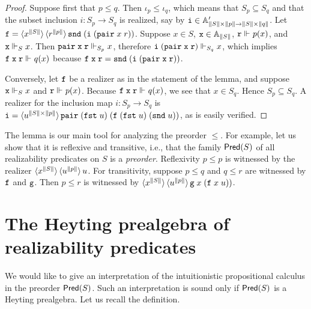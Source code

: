 \begin{proof}
  Suppose first that $p \leq q$. Then $\iota_p \leq \iota_q$, which
  means that $S_p \subseteq S_q$ and that the subset inclusion $i :
  S_p \to S_q$ is realized, say by $\R{i} \in \subAtyp{\T{S} \times \T{p}
    \to \T{S} \times \T{q}}$. Let $\R{f} = \tpcalam{x}{\T{S}}
    \tpcalam{r}{\T{p}}{\combSnd\;(\R{i}\;(\combPair\;x\;r))}$. Suppose $x
  \in S$, $\R{x} \in \Atyp{\T{S}}$, $\R{r} \rz p(x)$, and $\R{x} \rz[S]
  x$. Then $\combPair\;\R{x}\;\R{r} \rz[S_p] x$, therefore
  $\R{i}\;(\combPair\;\R{x}\;\R{r}) \rz[S_q] x$, which implies
  $\R{f}\;\R{x}\;\R{r} \rz q(x)$ because $\R{f}\;\R{x}\;\R{r} =
  \combSnd\;(\R{i}\;(\combPair\;\R{x}\;\R{r}))$.

  Conversely, let $\R{f}$ be a realizer as in the statement of the
  lemma, and suppose $\R{x} \rz[S] x$ and $\R{r} \rz p(x)$. Because
  $\R{f}\;\R{x}\;\R{r} \rz q(x)$, we see that $x \in S_q$. Hence $S_p
  \subseteq S_q$. A realizer for the inclusion map $i : S_p \to S_q$
  is $\R{i} = \tpcalam{u}{\T{S} \times
      \T{p}}{\combPair\;(\combFst\;u)\;(\R{f}\;(\combFst\;u)\;(\combSnd\;u))}$,
  as is easily verified.
\end{proof}

The lemma is our main tool for analyzing the preorder $\leq$. For
example, let us show that it is reflexive and transitive, i.e., that
the family $\Pred{S}$ of all realizability predicates on
$S$ is a \emph{preorder}. Reflexivity $p \leq p$ is witnessed by
the realizer $\tpcalam{x}{\T{S}} \tpcalam{u}{\T{p}}{u}$. For
transitivity, suppose $p \leq q$ and $q \leq r$ are witnessed by
$\R{f}$ and $\R{g}$. Then $p \leq r$ is witnessed by
$\tpcalam{x}{\T{S}} \tpcalam{u}{\T{p}}{\R{g}\;x\;(\R{f}\;x\;u))}$.


\section{The Heyting prealgebra of realizability predicates}
\label{sec:heyting-prealgebra}

We would like to give an interpretation of the intuitionistic
propositional calculus in the preorder $\Pred{S}$. Such an
interpretation is sound only if $\Pred{S}$ is a Heyting
prealgebra. Let us recall the definition.

